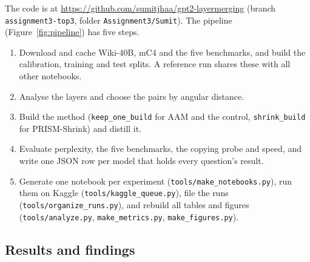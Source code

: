 \documentclass[11pt]{article}
\begin{document}
The code is at \url{https://github.com/sumitjhaa/gpt2-layermerging} (branch \texttt{assignment3-top3}, folder
\texttt{Assignment3/Sumit}). The pipeline (Figure~\ref{fig:pipeline}) has five steps.
\begin{enumerate}
  \item Download and cache Wiki-40B, mC4 and the five benchmarks, and build the calibration, training and test
        splits. A reference run shares these with all other notebooks.
  \item Analyse the layers and choose the pairs by angular distance.
  \item Build the method (\texttt{keep\_one\_build} for AAM and the control, \texttt{shrink\_build} for
        PRISM-Shrink) and distill it.
  \item Evaluate perplexity, the five benchmarks, the copying probe and speed, and write one JSON row per model that
        holds every question's result.
  \item Generate one notebook per experiment (\texttt{tools/make\_notebooks.py}), run them on Kaggle
        (\texttt{tools/kaggle\_queue.py}), file the runs (\texttt{tools/organize\_runs.py}), and rebuild all
        tables and figures (\texttt{tools/analyze.py}, \texttt{make\_metrics.py}, \texttt{make\_figures.py}).
\end{enumerate}

\subsection{Results and findings}
\end{document}
